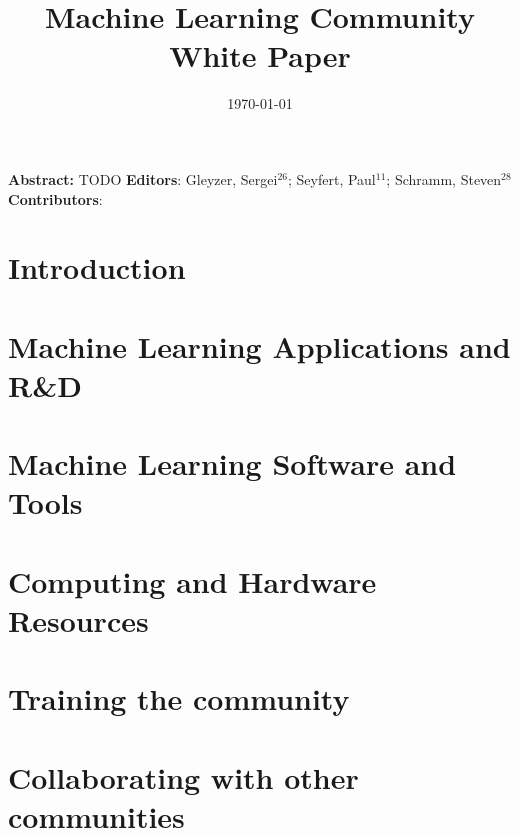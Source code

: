 \documentclass{article}
\title{Machine Learning Community White Paper}
\date{\today}
\begin{document}
\normalsize



\clearpage


\maketitle

\setlength\parindent{0pt}
\textbf{Abstract:} TODO
\vskip 1cm
\textbf{Editors}: Gleyzer, Sergei$^{26}$; Seyfert, Paul$^{11}$; Schramm, Steven$^{28}$\\
\newline
\textbf{Contributors}:


\tableofcontents
\clearpage

\section{Introduction}
\label{sec:introduction}


\section{Machine Learning Applications and R\&D}
\label{sec:applications}


\section{Machine Learning Software and Tools}
\label{sec:software}


%

\section{Computing and Hardware Resources}
\label{sec:resources}


\section{Training the community}
\label{sec:training}


\section{Collaborating with other communities}
\label{sec:collaboration}

\end{document}

